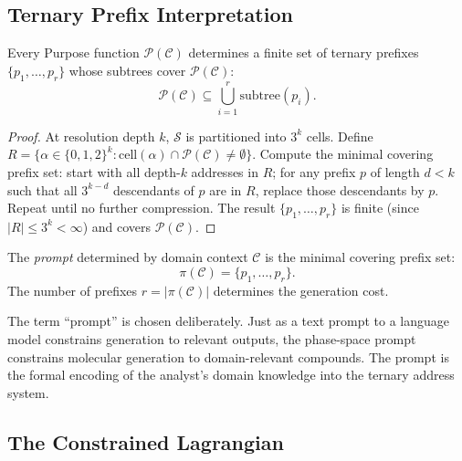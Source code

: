 \subsection{Ternary Prefix Interpretation}
\label{sec:ch24-prefix}

\begin{theorem}
\label{thm:ch24-prompt-prefix}
Every Purpose function $\mathcal{P}(\mathcal{C})$ determines a finite set of
ternary prefixes $\{p_1, \ldots, p_r\}$ whose subtrees cover
$\mathcal{P}(\mathcal{C})$:
\begin{equation}
\label{eq:ch24-prefix-cover}
  \mathcal{P}(\mathcal{C}) \subseteq \bigcup_{i=1}^{r} \mathrm{subtree}(p_i).
\end{equation}
\end{theorem}

\begin{proof}
At resolution depth $k$, $\mathcal{S}$ is partitioned into $3^k$ cells.
Define $R = \{\alpha \in \{0,1,2\}^k : \mathrm{cell}(\alpha) \cap
\mathcal{P}(\mathcal{C}) \neq \emptyset\}$.  Compute the minimal covering
prefix set: start with all depth-$k$ addresses in $R$; for any prefix $p$
of length $d < k$ such that all $3^{k-d}$ descendants of $p$ are in $R$,
replace those descendants by $p$.  Repeat until no further compression.
The result $\{p_1, \ldots, p_r\}$ is finite (since $|R| \leq 3^k < \infty$)
and covers $\mathcal{P}(\mathcal{C})$.
\end{proof}

\begin{definition}[Prompt]
\label{def:ch24-prompt}
The \emph{prompt} determined by domain context $\mathcal{C}$ is the
minimal covering prefix set:
\[
  \pi(\mathcal{C}) = \{p_1, \ldots, p_r\}.
\]
The number of prefixes $r = |\pi(\mathcal{C})|$ determines the generation cost.
\end{definition}

\begin{remark}
The term ``prompt'' is chosen deliberately.  Just as a text prompt to a
language model constrains generation to relevant outputs, the phase-space
prompt constrains molecular generation to domain-relevant compounds.  The
prompt is the formal encoding of the analyst's domain knowledge into the
ternary address system.
\end{remark}

\subsection{The Constrained Lagrangian}
\label{sec:ch24-constrained}

